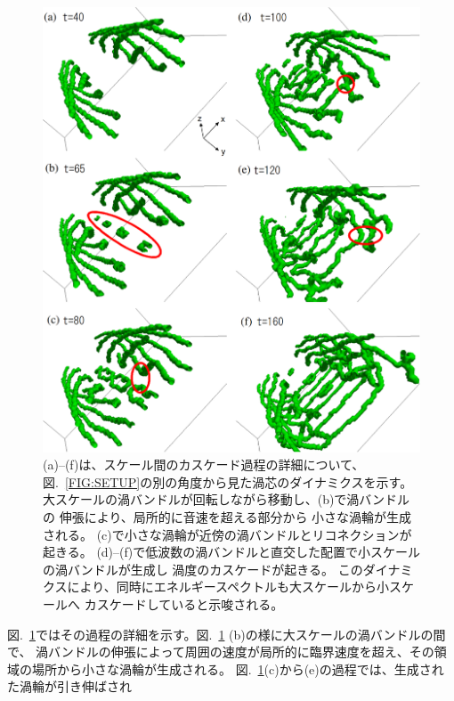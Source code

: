 \documentclass[12pt,a4paper]{jbook}
\begin{document}
			\begin{figure}[H]
				\centering
				\includegraphics[width=15cm]{bundle_core.eps}
				\caption{
					(a)--(f)は、スケール間のカスケード過程の詳細について、
					図.~\ref{FIG:SETUP}の別の角度から見た渦芯のダイナミクスを示す。
                    大スケールの渦バンドルが回転しながら移動し、(b)で渦バンドルの
                    伸張により、局所的に音速を超える部分から
                    小さな渦輪が生成される。
                    (c)で小さな渦輪が近傍の渦バンドルとリコネクションが起きる。
                    (d)--(f)で低波数の渦バンドルと直交した配置で小スケールの渦バンドルが生成し
                    渦度のカスケードが起きる。
                    このダイナミクスにより、同時にエネルギースペクトルも大スケールから小スケールへ
                    カスケードしていると示唆される。
				}
				\label{FIG:bndl_core}
			\end{figure}
			図.~\ref{FIG:bndl_core}ではその過程の詳細を示す。図.~\ref{FIG:bndl_core} (b)の様に大スケールの渦バンドルの間で、
			渦バンドルの伸張によって周囲の速度が局所的に臨界速度を超え、その領域の場所から小さな渦輪が生成される。
			図.~\ref{FIG:bndl_core}(c)から(e)の過程では、生成された渦輪が引き伸ばされ
\end{document}
